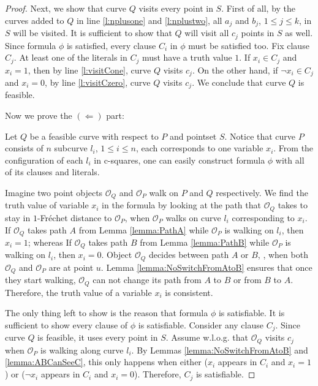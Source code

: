 \documentclass[a4paper,UKenglish]{lipics}
\newcommand{\CS}{{\mathscr S}}
\newcommand{\CO}{{\mathscr O}}
\newcommand{\CQ}{{\mathscr Q}}
\newcommand{\cfev}{{l}} \newcommand{\sq}{{\CS\CQ}}
\newcommand{\Frechet}{Fr\'echet }
\newcommand{\pset}{S}
\begin{document}
\begin{proof}
Next, we show that curve $Q$ visits every point in $S$. First of 
all, by the curves added to $Q$ 
in line \ref{l:nplusone} and \ref{l:nplustwo}, 
all $a_j$ and $b_j$, $1\le j \le k$, in $S$ will be visited. 
It is sufficient to show that $Q$ will visit all $c_j$ points in $S$  as well.
Since  formula $\phi$ is satisfied, every clause $C_i$ in $\phi$ must be satisfied 
too. Fix clause $C_j$. At least one of the literals in $C_j$
must have a truth value $1$. If $x_i \in C_j$ and $x_i = 1$, 
then by line \ref{l:visitCone}, curve $Q$ visits $c_j$.
On the other hand, if $\neg x_i \in C_j$ and $x_i = 0$, 
by line \ref{l:visitCzero}, curve $Q$ visits $c_j$. We conclude that 
curve $Q$ is feasible.
 

Now we prove the $(\Leftarrow)$ part:

Let $Q$ be a feasible curve with respect to $P$ and pointset $\pset$.
Notice that curve $P$ consists of $n$ subcurve $\cfev_i$, 
$1 \le i \le n $, each corresponds to one variable $x_i$. 
From the configuration of each $\cfev_i$ in c-squares, 
one can easily construct formula $\phi$ with 
all of its clauses and literals. 


 
Imagine two point objects $\CO_Q$ 
and $\CO_P$ walk on $P$ and $Q$ respectively. 
We find the truth value of variable $x_i$ in the formula
by looking at the path that $\CO_Q$ takes to stay in $1$-\Frechet distance to $\CO_P$, 
when $\CO_P$ walks on curve $\cfev_i$ corresponding to $x_i$.
If $\CO_Q$ takes path $A$ from Lemma \ref{lemma:PathA} 
while $\CO_P$ is walking on  $\cfev_i$, then $x_i = 1$; 
whereas If $\CO_Q$ takes path $B$ from Lemma \ref{lemma:PathB} 
while $\CO_P$ is walking on  $\cfev_i$, then $x_i = 0$. 
Object $\CO_Q$ decides between path $A$ or $B$, 
, when both $\CO_Q$ and $\CO_P$ are at point $u$. 
Lemma \ref{lemma:NoSwitchFromAtoB} ensures that  
once they start walking, 
$\CO_Q$ can not change its path from $A$ to $B$ 
or from $B$ to $A$. 
Therefore, the truth value of a variable $x_i$ is consistent.


The only thing left to show is the reason that formula $\phi$ is satisfiable. 
It is sufficient to show every clause of $\phi$ is satisfiable. 
Consider any clause $C_j$.
Since curve $Q$ is feasible, 
it uses every point in $\pset$.  
Assume w.l.o.g. that $\CO_Q$ visits $c_j$ 
when $\CO_P$ is walking along curve $\cfev_i$.  
By Lemmas 
\ref{lemma:NoSwitchFromAtoB} and \ref{lemma:ABCanSeeC},
this only happens when either ($x_i$ appears in $C_i$ and $x_i = 1$)
or ($\neg x_i$ appears in $C_i$ and $x_i =0$). 
Therefore, $C_j$ is satisfiable.













\end{proof}
\end{document}
